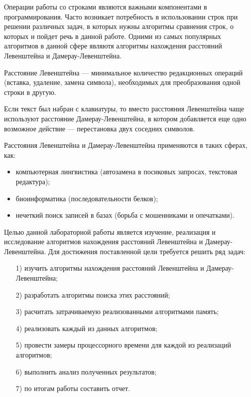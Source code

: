 

Операции работы со строками являются важными компонентами в программирования. Часто возникает потребность в использовании строк при решении различных
задач, в которых нужны алгоритмы сравнения строк, о которых
и пойдет речь в данной работе. Одними из самых популярных алгоритмов в данной сфере являютя алгоритмы нахождения расстояний Левенштейна и Дамерау-Левенштейна.

Расстояние Левенштейна --– минимальное количество редакционных операций (вставка, удаление, замена символа), необходимых для преобразования одной строки в другую. 

Если текст был набран с клавиатуры, то вместо расстояния Левенштейна чаще используют расстояние Дамерау-Левенштейна, в котором добавляется еще одно возможное действие --- перестановка двух соседних символов.

Расстояния Левенштейна и Дамерау-Левенштейна применяются в таких сферах, как: 
\begin{itemize}
	\item компьютерная лингвистика (автозамена в посиковых запросах, текстовая редактура);
	\item биоинформатика (последовательности белков);
	\item нечеткий поиск записей в базах (борьба с мошенниками и опечатками).
\end{itemize}

Целью данной лабораторной работы является изучение, реализация и исследование
алгоритмов нахождения расстояний Левенштейна и Дамерау-Левенштейна.
\newpage
Для достижения поставленной цели требуется решить ряд задач:
\begin{enumerate}
	\item[1)] изучить алгоритмы нахождения расстояний Левенштейна и Дамерау-Левенштейна;
	\item[2)] разработать алгоритмы поиска этих расстояний;
	\item[3)] расчитать затрачиваемую реализованными алгоритмами память;
	\item[4)] реализовать каждый из данных алгоритмов;
	\item[5)] провести замеры процессорного времени для каждой из реализаций алгоритмов;
 	\item[6)] выполнить анализ полученных результатов;
	\item[7)] по итогам работы составить отчет.
\end{enumerate}

\newpage
